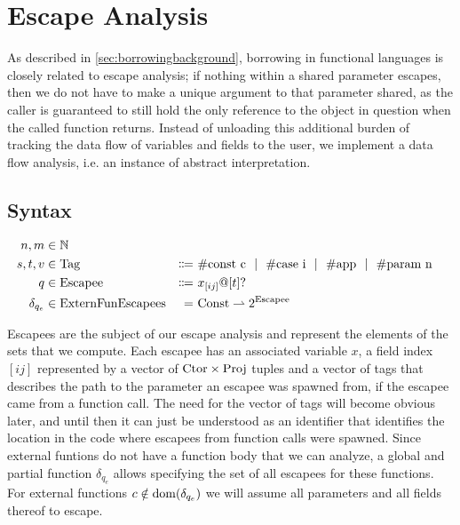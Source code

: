 \newcommand{\Tag}{\mathrm{Tag}}
\newcommand{\Escapee}{\mathrm{Escapee}}
\newcommand{\ExternFunEscapees}{\mathrm{ExternFunEscapees}}

\section{Escape Analysis}\label{sec:escapeanalysis}
As described in \cref{sec:borrowingbackground}, borrowing in functional languages is closely related to escape analysis; if nothing within a shared parameter escapes, then we do not have to make a unique argument to that parameter shared, as the caller is guaranteed to still hold the only reference to the object in question when the called function returns. Instead of unloading this additional burden of tracking the data flow of variables and fields to the user, we implement a data flow analysis, i.e. an instance of abstract interpretation.

\subsection{Syntax}

\begin{alignat*}{3}
  n, m &\in \mathbb{N} \\
  s, t, v &\in \Tag &\Coloneqq&\ \#\textrm{const c} \sep \#\textrm{case i} \sep \#\textrm{app} \sep \#\textrm{param n} \\
  q &\in \Escapee\ &\Coloneqq&\ x_{[ij]} @ [t]? \\
  \delta_{q_e} &\in \ExternFunEscapees &=&\ \Const \rightharpoonup 2^{\Escapee}
\end{alignat*}

Escapees are the subject of our escape analysis and represent the elements of the sets that we compute. Each escapee has an associated variable $x$, a field index $[ij]$ represented by a vector of $\mathrm{Ctor} \times \mathrm{Proj}$ tuples and a vector of tags that describes the path to the parameter an escapee was spawned from, if the escapee came from a function call. The need for the vector of tags will become obvious later, and until then it can just be understood as an identifier that identifies the location in the code where escapees from function calls were spawned. Since external funtions do not have a function body that we can analyze, a global and partial function $\delta_{q_e}$ allows specifying the set of all escapees for these functions. For external functions $c \notin \mathrm{dom}(\delta_{q_e})$ we will assume all parameters and all fields thereof to escape.

